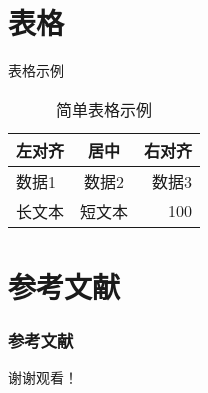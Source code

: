 \documentclass{beamer}
\begin{document}
\section{表格}
\begin{frame}{表格示例}
  \begin{table}
    \centering
    \begin{tabular}{l|c|r}
      \toprule
      左对齐 & 居中 & 右对齐 \\
      \midrule
      数据1 & 数据2 & 数据3 \\
      长文本 & 短文本 & 100 \cite{ctex2020manual}\\
      \bottomrule
    \end{tabular}
    \caption{简单表格示例}
  \end{table}
\end{frame}

\section{参考文献}

\begin{frame}
  \frametitle{参考文献}
  
  
\end{frame}

\begin{frame}
  \centering
  \LARGE 谢谢观看！

  \vspace{1cm}
  \normalsize

\end{frame}
\end{document}
